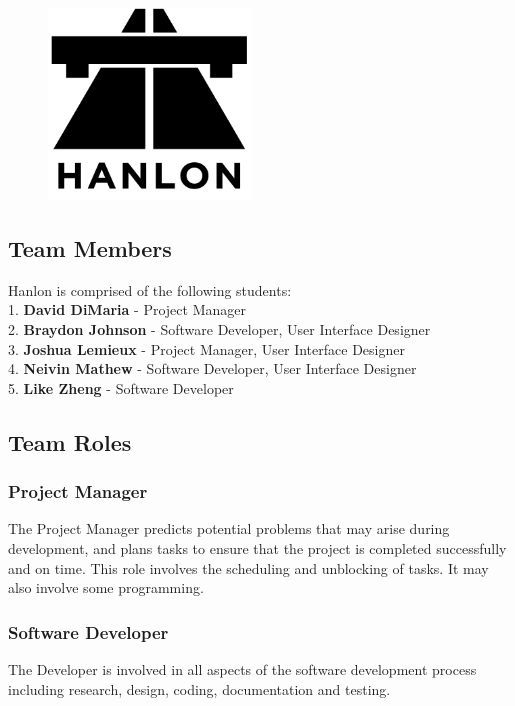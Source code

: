 \documentclass[12pt,letterpaper]{article}
\begin{document}
\begin{figure}[H]
	\centering	
	\includegraphics[height=2in]{img/hanlon-logo.png}
	\label{fig:kitten}
\end{figure}

\subsection{Team Members}
Hanlon is comprised of the following students:\\
1. \textbf{\hspace*{8pt}David DiMaria} - Project Manager\\
2. \textbf{\hspace*{8pt}Braydon Johnson} - Software Developer, User Interface Designer\\
3. \textbf{\hspace*{8pt}Joshua Lemieux} - Project Manager, User Interface Designer\\
4. \textbf{\hspace*{8pt}Neivin Mathew} - Software Developer, User Interface Designer\\
5. \textbf{\hspace*{8pt}Like Zheng} - Software Developer

\subsection{Team Roles}
\subsubsection*{Project Manager}
The Project Manager predicts potential problems that may arise during development, and plans tasks to ensure that the project is completed successfully and on time. This role involves the scheduling and unblocking of tasks. It may also involve some programming.

\subsubsection*{Software Developer}
The Developer is involved in all aspects of the software development process including research, design, coding, documentation and testing.
\end{document}
